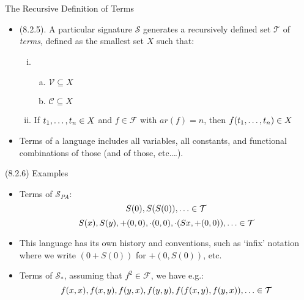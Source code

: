 \begin{frame}{The Recursive Definition of Terms}

	\begin{itemize}%
	\itemsep=16pt
	
		\item (8.2.5). A particular signature $\mathcal{S}$ generates a recursively defined set $\mathcal{T}$ of \emph{terms}, defined as the smallest set $X$ such that:
		\begin{enumerate}[(i)]
		
			\item \begin{enumerate}[(a)]
			\item $\mathcal{V}\subseteq X$
			\item $\mathcal{C}\subseteq X$
			\end{enumerate}
			\item If $t_1, \mathellipsis, t_n\in X$ and $f\in\mathcal{F}$ with $ar(f)=n$, then $f(t_1, \mathellipsis, t_n)\in X$
	
	\end{enumerate}
	
		\item Terms of a language includes all variables, all constants, and functional combinations of those (and of those, etc.\ldots).
		
	\end{itemize}

\end{frame}

\begin{frame}{(8.2.6) Examples}

	\begin{itemize}
	\itemsep=20pt
			
				\item Terms of $\mathcal{S}_{PA}$: \[S(0),S(S(0)),\mathellipsis\in\mathcal{T}\]\[S(x), S(y), +(0,0), \cdot(0,0), \cdot (Sx, +(0,0)),\mathellipsis\in\mathcal{T}\]	
				
				\item[] This language has its own history and conventions, such as `infix' notation where we write $(0 + S(0))$ for ${+}(0,S(0))$, etc.
					


				\item Terms of $\mathcal{S_\ast}$, assuming that $f^2\in\mathcal{F}$, we have e.g.: \[f(x,x), f(x,y), f(y,x), f(y,y), f(f(x,y), f(y,x)),\mathellipsis\in\mathcal{T}\]
			\end{itemize}


\end{frame}

